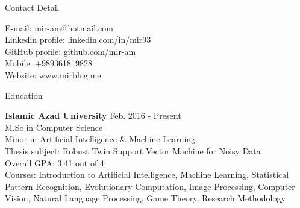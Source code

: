 \documentclass{resume} %
\begin{document}


\begin{rSection}{Contact Detail}

\begin{multicols}{2}
E-mail: mir-am@hotmail.com \\
Linkedin profile: linkedin.com/in/mir93 \\
GitHub profile: github.com/mir-am \\
\vfill\null
\columnbreak
Mobile: +989361819828\\
Website: www.mirblog.me\\

\end{multicols}

	
	

	



	
\end{rSection}


\begin{rSection}{Education}

{\bf Islamic Azad University} \hfill {Feb. 2016 - Present} \\ 
M.Sc in Computer Science  \\
Minor in Artificial Intelligence \& Machine Learning  \smallskip \\
Thesis subject: Robust Twin Support Vector Machine for Noisy Data \\
Overall GPA: 3.41 out of 4 \\
Courses: Introduction to Artificial Intelligence, Machine Learning, Statistical Pattern Recognition, Evolutionary Computation, Image Processing, Computer Vision, Natural Language Processing, Game Theory, Research Methodology

\end{rSection}
\end{document}
